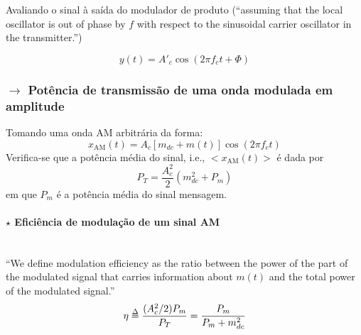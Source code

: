 \noindent Avaliando o sinal à saída do modulador de produto (``assuming that the
local oscillator is out of phase by $f$ with respect to the sinusoidal carrier
 oscillator in the transmitter.''\cite{Haykin2007})

 $$
    y(t) = A'_c\cos{(2\pi f_c t + \Phi)}
 $$

\subsubsection[2.1.5 Potência de transmissão de uma onda modulada em amplitude]{$\rightarrow$ Potência de transmissão de uma onda modulada em amplitude}
\label{subsubsec:AM-power}

Tomando uma onda AM arbitrária da forma:
$$
    x_{\text{AM}}(t) = A_c[m_{dc} + m(t)] \cos(2\pi f_c t) 
$$
Verifica-se que a potência média do sinal, i.e., $<x_{\text{AM}}(t)>$ é dada por
$$
    P_T = \frac{A^2_c}{2}\left( m_{dc}^2 + P_m \right)
$$
em que $P_m$ é a potência média do sinal mensagem.

\paragraph[2.1.5.1 Eficiência de modulação de um sinal AM]{$\pmb{\star}$ Eficiência de modulação de um sinal AM}\mbox{}\\
 ``We define modulation efficiency as the ratio between the power of the part of the modulated signal that carries information about $m(t)$ and the total power of the modulated signal.''\cite{Nunes2015}
 $$
    \eta \delequal \frac{(A^2_c/2)P_m}{P_T} = \frac{P_m}{P_m + m_{dc}^2}
 $$
